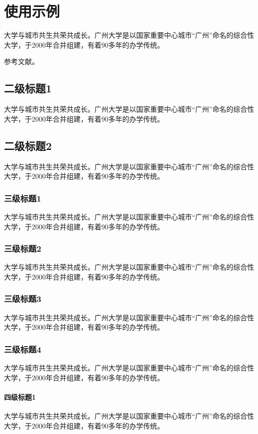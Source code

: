 \section{使用示例}
大学与城市共生共荣共成长。广州大学是以国家重要中心城市“广州”命名的综合性大学，于2000年合并组建，有着90多年的办学传统。

参考文献。

\subsection{二级标题1}
大学与城市共生共荣共成长。广州大学是以国家重要中心城市“广州”命名的综合性大学，于2000年合并组建，有着90多年的办学传统。

\subsection{二级标题2}
大学与城市共生共荣共成长。广州大学是以国家重要中心城市“广州”命名的综合性大学，于2000年合并组建，有着90多年的办学传统。

\subsubsection{三级标题1}
大学与城市共生共荣共成长。广州大学是以国家重要中心城市“广州”命名的综合性大学，于2000年合并组建，有着90多年的办学传统。

\subsubsection{三级标题2}
大学与城市共生共荣共成长。广州大学是以国家重要中心城市“广州”命名的综合性大学，于2000年合并组建，有着90多年的办学传统。

\subsubsection{三级标题3}
大学与城市共生共荣共成长。广州大学是以国家重要中心城市“广州”命名的综合性大学，于2000年合并组建，有着90多年的办学传统。

\subsubsection{三级标题4}
大学与城市共生共荣共成长。广州大学是以国家重要中心城市“广州”命名的综合性大学，于2000年合并组建，有着90多年的办学传统。

\paragraph{四级标题1}
大学与城市共生共荣共成长。广州大学是以国家重要中心城市“广州”命名的综合性大学，于2000年合并组建，有着90多年的办学传统。

